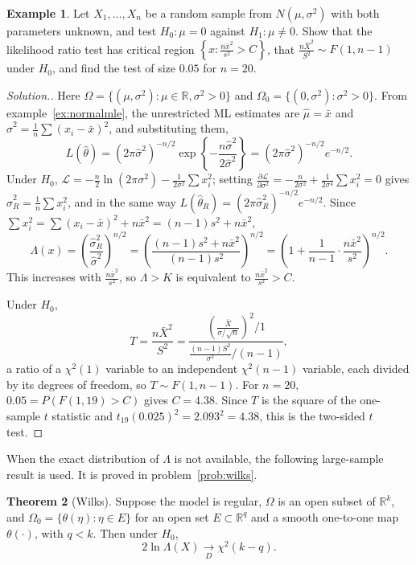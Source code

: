 \documentclass[12pt,a4paper]{report}
\theoremstyle{definition}
\newtheorem{thm}{Theorem}[section]
\newtheorem{exa}[thm]{Example}
\newenvironment{solution}
  {\renewcommand{\qedsymbol}{}\begin{proof}[\textit{Solution}.]}
  {\end{proof}}
\begin{document}
\begin{exa}
\label{ex:lrtt}
Let $X_1, \dots, X_n$ be a random sample from $N(\mu, \sigma^2)$ with both parameters
unknown, and test $H_0\colon\mu = 0$ against $H_1\colon\mu\ne 0$. Show that the
likelihood ratio test has critical region $\left\{x : \frac{n\bar x^2}{s^2}>C\right\}$, that
$\frac{n\bar X^2}{S^2}\sim F(1, n - 1)$ under $H_0$, and find the test of size $0.05$ for
$n = 20$.
\end{exa}

\begin{solution}
Here $\Omega = \{(\mu, \sigma^2) : \mu\in\mathbb{R}, \sigma^2>0\}$ and
$\Omega_0 = \{(0, \sigma^2) : \sigma^2>0\}$. From example~\ref{ex:normalmle}, the unrestricted
ML estimates are $\hat\mu = \bar x$ and $\hat\sigma^2 = \frac1n\sum(x_i - \bar x)^2$, and
substituting them,
\[L(\hat\theta) = (2\pi\hat\sigma^2)^{-n/2}\exp\left\{-\frac{n\hat\sigma^2}{2\hat\sigma^2}\right\} = (2\pi\hat\sigma^2)^{-n/2}e^{-n/2} .\]
Under $H_0$, $\mathcal{L} = -\frac n2\ln(2\pi\sigma^2) - \frac{1}{2\sigma^2}\sum x_i^2$; setting
$\frac{\partial\mathcal{L}}{\partial\sigma^2} = -\frac{n}{2\sigma^2} + \frac{1}{2\sigma^4}\sum x_i^2 = 0$ gives
$\hat\sigma_R^2 = \frac1n\sum x_i^2$, and in the same way
$L(\hat\theta_R) = (2\pi\hat\sigma_R^2)^{-n/2}e^{-n/2}$. Since
$\sum x_i^2 = \sum(x_i - \bar x)^2 + n\bar x^2 = (n - 1)s^2 + n\bar x^2$,
\[\Lambda(x) = \left(\frac{\hat\sigma_R^2}{\hat\sigma^2}\right)^{n/2}
= \left(\frac{(n - 1)s^2 + n\bar x^2}{(n - 1)s^2}\right)^{n/2}
= \left(1 + \frac{1}{n - 1}\cdot\frac{n\bar x^2}{s^2}\right)^{n/2} .\]
This increases with $\frac{n\bar x^2}{s^2}$, so $\Lambda>K$ is equivalent to
$\frac{n\bar x^2}{s^2}>C$.

Under $H_0$,
\[T = \frac{n\bar X^2}{S^2} = \frac{\left(\frac{\bar X}{\sigma/\sqrt n}\right)^2\big/1}{\frac{(n - 1)S^2}{\sigma^2}\big/(n - 1)},\]
a ratio of a $\chi^2(1)$ variable to an independent $\chi^2(n - 1)$ variable, each
divided by its degrees of freedom, so $T\sim F(1, n - 1)$. For $n = 20$,
$0.05 = P(F(1, 19)>C)$ gives $C = 4.38$. Since $T$ is the square of the one-sample $t$
statistic and $t_{19}(0.025)^2 = 2.093^2 = 4.38$, this is the two-sided $t$ test.
\end{solution}

When the exact distribution of $\Lambda$ is not available, the following
large-sample result is used. It is proved in problem~\ref{prob:wilks}.

\begin{thm}[Wilks]
\label{thm:wilkssi}
Suppose the model is regular, $\Omega$ is an open subset of $\mathbb{R}^k$, and
$\Omega_0 = \{\theta(\eta) : \eta\in E\}$ for an open set $E\subset\mathbb{R}^q$ and a smooth
one-to-one map $\theta(\cdot)$, with $q<k$. Then under $H_0$,
\[2\ln\Lambda(X)\underset{D}{\longrightarrow}\chi^2(k - q) .\]
\end{thm}
\end{document}
